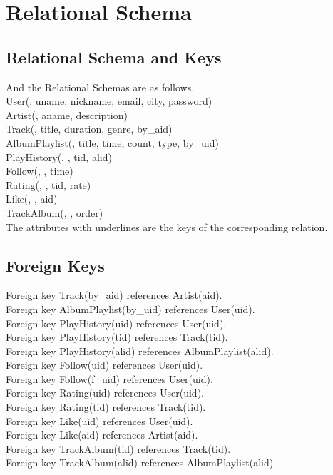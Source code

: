 \documentclass[letter, 12pt]{report}
\begin{document}
	\section{Relational Schema}
	\subsection{Relational Schema and Keys}
	And the Relational Schemas are as follows.\\
	User(\underline{}, uname, nickname, email, city, password)\\
	Artist(\underline{}, aname, description)\\
	Track(\underline{}, title, duration, genre, by\_aid)\\
	AlbumPlaylist(\underline{}, title, time, count, type, by\_uid)\\
	PlayHistory(\underline{}, \underline{}, tid, alid)\\
	Follow(\underline{}, \underline{}, time)\\
	Rating(\underline{}, \underline{}, tid, rate)\\
	Like(\underline{}, \underline{}, aid)\\
	TrackAlbum(\underline{}, \underline{}, order)\\
	The attributes with underlines are the keys of the corresponding relation.
	\subsection{Foreign Keys}
	Foreign key Track(by\_aid) references Artist(aid).\\
	Foreign key AlbumPlaylist(by\_uid) references User(uid).\\
	Foreign key PlayHistory(uid) references User(uid).\\
	Foreign key PlayHistory(tid) references Track(tid).\\
	Foreign key PlayHistory(alid) references AlbumPlaylist(alid).\\
	Foreign key Follow(uid) references User(uid).\\
	Foreign key Follow(f\_uid) references User(uid).\\
	Foreign key Rating(uid) references User(uid).\\
	Foreign key Rating(tid) references Track(tid).\\
	Foreign key Like(uid) references User(uid).\\
	Foreign key Like(aid) references Artist(aid).\\
	Foreign key TrackAlbum(tid) references Track(tid).\\
	Foreign key TrackAlbum(alid) references AlbumPlaylist(alid).\\
	
\end{document}
